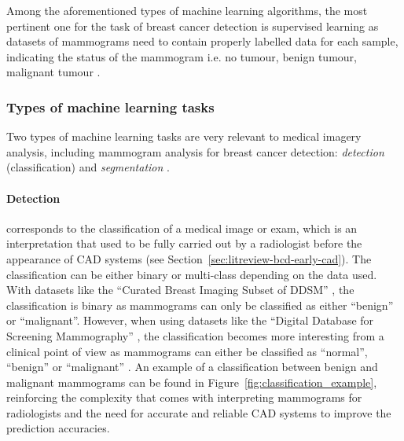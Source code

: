 Among the aforementioned types of machine learning algorithms, the most pertinent one for the task of breast cancer detection is supervised learning as datasets of mammograms need to contain properly labelled data for each sample, indicating the status of the mammogram i.e. no tumour, benign tumour, malignant tumour \citep{Shen2017}.

\subsubsection{Types of machine learning tasks}

Two types of machine learning tasks are very relevant to medical imagery analysis, including mammogram analysis for breast cancer detection: \textit{detection} (classification) and \textit{segmentation} \citep{Litjens2017}. 

\paragraph{Detection} corresponds to the classification of a medical image or exam, which is an interpretation that used to be fully carried out by a radiologist before the appearance of CAD systems (see Section~\ref{sec:litreview-bcd-early-cad}). The classification can be either binary or multi-class depending on the data used. With datasets like the ``Curated Breast Imaging Subset of DDSM'' \citep{Lee2017}, the classification is binary as mammograms can only be classified as either ``benign'' or ``malignant''. However, when using datasets like the ``Digital Database for Screening Mammography'' \citep{DDSMdataset2001}, the classification becomes more interesting from a clinical point of  view as mammograms can either be classified as ``normal'', ``benign'' or ``malignant'' \citep{Litjens2017}. An example of a classification between benign and malignant mammograms can be found in Figure~\ref{fig:classification_example}, reinforcing the complexity that comes with interpreting mammograms for radiologists and the need for accurate and reliable CAD systems to improve the prediction accuracies.

